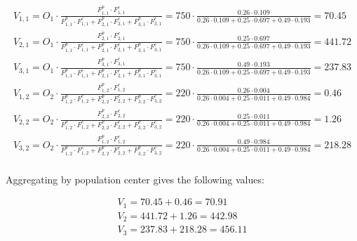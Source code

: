 \documentclass[]{elsarticle} %
\begin{document}
\begin{equation}
\label{eq:SA-2populations}
\begin{array}{l}

V_{1,1} = O_1\cdot \frac{F^p_{1,1} \cdot F^c_{1,1}}{F^p_{1,1} \cdot F^c_{1,1} + F^p_{2,1} \cdot F^c_{2,1} + F^p_{3,1} \cdot F^c_{3,1}} = 
750 \cdot \frac{0.26 \cdot 0.109}{0.26 \cdot 0.109 + 0.25 \cdot 0.697 + 0.49 \cdot 0.193} = 70.45\\
V_{2,1} = O_1\cdot \frac{F^p_{2,1} \cdot F^c_{2,1}}{F^p_{1,1} \cdot F^c_{1,1} + F^p_{2,1} \cdot F^c_{2,1} + F^p_{3,1} \cdot F^c_{3,1}} = 
750 \cdot \frac{0.25 \cdot 0.697}{0.26 \cdot 0.109 + 0.25 \cdot 0.697 + 0.49 \cdot 0.193} = 441.72\\
V_{3,1} = O_1\cdot \frac{F^p_{3,1} \cdot F^c_{3,1}}{F^p_{1,1} \cdot F^c_{1,1} + F^p_{2,1} \cdot F^c_{2,1} + F^p_{3,1} \cdot F^c_{3,1}} = 
750 \cdot \frac{0.49 \cdot 0.193}{0.26 \cdot 0.109 + 0.25 \cdot 0.697 + 0.49 \cdot 0.193} = 237.83\\

V_{1,2} = O_2\cdot \frac{F^p_{1,2} \cdot F^c_{1,2}}{F^p_{1,2} \cdot F^c_{1,2} + F^p_{2,2} \cdot F^c_{2,2} + F^p_{3,2} \cdot F^c_{3,2}} = 
220 \cdot \frac{0.26 \cdot 0.004}{0.26 \cdot 0.004 + 0.25 \cdot 0.011 + 0.49 \cdot 0.984} = 0.46\\
V_{2,2} = O_2\cdot \frac{F^p_{2,2} \cdot F^c_{2,2}}{F^p_{1,2} \cdot F^c_{1,2} + F^p_{2,2} \cdot F^c_{2,2} + F^p_{3,2} \cdot F^c_{3,2}} = 
220 \cdot \frac{0.25 \cdot 0.011}{0.26 \cdot 0.004 + 0.25 \cdot 0.011 + 0.49 \cdot 0.984} = 1.26\\
V_{3,2} = O_2\cdot \frac{F^p_{1,2} \cdot F^c_{1,2}}{F^p_{1,2} \cdot F^c_{1,2} + F^p_{2,2} \cdot F^c_{2,2} + F^p_{3,2} \cdot F^c_{3,2}} = 
220 \cdot \frac{0.49 \cdot 0.984}{0.26 \cdot 0.004 + 0.25 \cdot 0.011 + 0.49 \cdot 0.984} = 218.28\\
\end{array}
\end{equation}

Aggregating by population center gives the following values:

\begin{equation}
\label{eq:SA-2populations-2}
\begin{array}{l}
V_{1} = 70.45 + 0.46 = 70.91\\
V_{2} = 441.72 + 1.26 = 442.98\\
V_{3} = 237.83 + 218.28 = 456.11\\
\end{array}
\end{equation}
\end{document}

